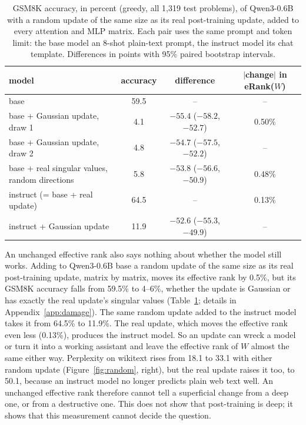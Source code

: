 \begin{table}[t]
\caption{GSM8K accuracy, in percent (greedy, all 1{,}319 test problems), of Qwen3-0.6B with
a random update of the same size as its real post-training update, added to
every attention and MLP matrix. Each pair uses the same prompt and token
limit: the base model an 8-shot plain-text prompt, the instruct model its chat
template. Differences in points with 95\% paired bootstrap intervals.}
\label{tab:damage}
\begin{center}
\small
\begin{tabular}{lccc}
\toprule
model & accuracy & difference & $|$change$|$ in eRank($W$) \\
\midrule
base                                           & 59.5 & --                         & -- \\
base + Gaussian update, draw 1                 & 4.1  & $-55.4$ ($-58.2$, $-52.7$) & 0.50\% \\
base + Gaussian update, draw 2                 & 4.8  & $-54.7$ ($-57.5$, $-52.2$) & --     \\
base + real singular values, random directions & 5.8  & $-53.8$ ($-56.6$, $-50.9$) & 0.48\% \\
\midrule
instruct (= base + real update)                & 64.5 & --                         & 0.13\% \\
instruct + Gaussian update                     & 11.9 & $-52.6$ ($-55.3$, $-49.9$) & -- \\
\bottomrule
\end{tabular}
\end{center}
\end{table}

An unchanged effective rank also says nothing about whether the model still
works. Adding to Qwen3-0.6B base a random update of the same size as its real
post-training update, matrix by matrix, moves its effective rank by 0.5\%, but
its GSM8K accuracy falls from 59.5\% to 4--6\%, whether the update is Gaussian
or has exactly the real update's singular values (Table~\ref{tab:damage};
details in Appendix~\ref{app:damage}).
The same random update added to the instruct model takes it from 64.5\% to
11.9\%. The real update, which moves the effective rank even less (0.13\%),
produces the instruct model. So an update can wreck a model or turn it into a
working assistant and leave the effective rank of $W$ almost the same either
way. Perplexity on wikitext rises from 18.1 to 33.1 with either random update
(Figure~\ref{fig:random}, right), but the real update raises it too, to 50.1,
because an instruct model no longer predicts plain web text well. An unchanged effective rank therefore cannot tell a
superficial change from a deep one, or from a destructive one. This does not
show that post-training is deep; it shows that this measurement cannot decide
the question.

